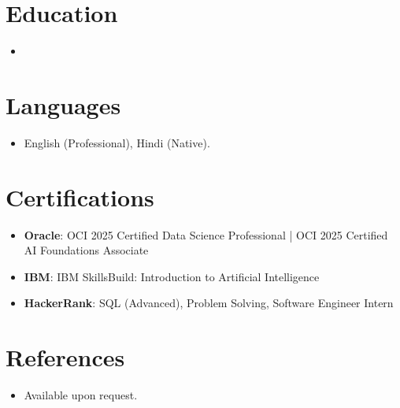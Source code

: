 \documentclass[11pt,a4paper,sans]{moderncv}
\begin{document}
\section{Education}
\vspace{1pt}
\begin{itemize}
\item{}
\end{itemize}

\section{Languages}
\vspace{1pt}
\begin{itemize}
\item English (Professional), Hindi (Native).
\end{itemize}

\section{Certifications}
\vspace{1pt}
\begin{itemize}
\item \textbf{Oracle}: OCI 2025 Certified Data Science Professional | OCI 2025 Certified AI Foundations Associate
\item \textbf{IBM}: IBM SkillsBuild: Introduction to Artificial Intelligence
\item \textbf{HackerRank}: SQL (Advanced), Problem Solving, Software Engineer Intern
\end{itemize}

\section{References}
\vspace{1pt}
\begin{itemize}
\item Available upon request.
\end{itemize}
\end{document}

